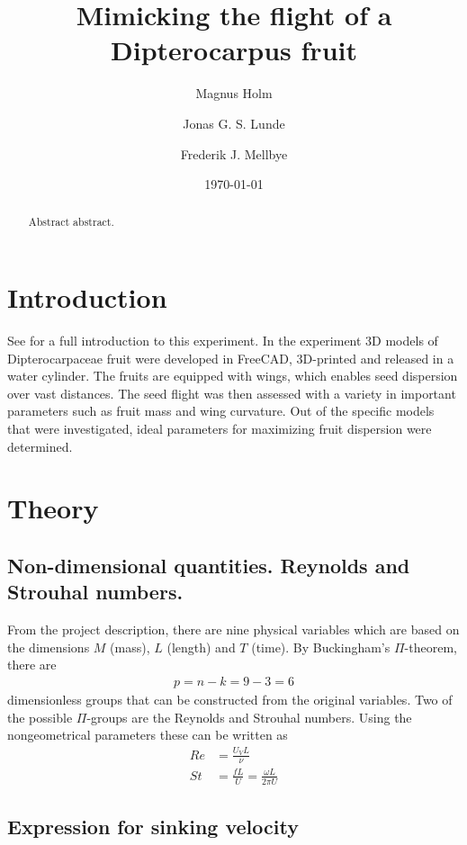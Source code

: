 \documentclass[aps,reprint]{revtex4-1}
\begin{document}
\title{Mimicking the flight of a Dipterocarpus fruit}
\author{Magnus Holm}
\author{Jonas G. S. Lunde}
\author{Frederik J. Mellbye}
\date{\today}

\begin{abstract}
Abstract abstract.
\end{abstract}
\maketitle

\section{Introduction}
\label{sec:introduction}
See \cite{instruks} for a full introduction to this experiment. In the experiment
3D models of Dipterocarpaceae fruit were developed in FreeCAD, 3D-printed and
released in a water cylinder. The fruits are equipped with wings, which enables
seed dispersion over vast distances. The seed flight was then assessed with a
variety in important parameters such as fruit mass and wing curvature. Out of the
specific models that were investigated, ideal parameters for maximizing fruit
dispersion were determined.

\section{Theory}
\label{sec:theory}
\subsection{Non-dimensional quantities. Reynolds and Strouhal numbers.}
From the project description, there are nine physical variables which are based
on the dimensions $M$ (mass), $L$ (length) and $T$ (time). By Buckingham's
$\Pi$-theorem, there are
\begin{align*}
  p = n - k = 9 - 3 = 6
\end{align*}
dimensionless groups that can be constructed from the original variables.
Two of the possible $\Pi$-groups are the Reynolds and Strouhal numbers. Using
the nongeometrical parameters these can be written as
\begin{align}
  Re &= \frac{U_V L}{\nu}\\
  St &= \frac{fL}{U} = \frac{\omega L}{2\pi U}
\end{align}
\subsection{Expression for sinking velocity}
\end{document}

